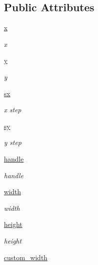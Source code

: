 \subsection*{Public Attributes}
\begin{DoxyCompactItemize}
\item 
\hyperlink{classvisualizer_1_1svgitem_1_1SvgItem_a2e9c288d8f56a32ef5e421f2a18da8d2}{x}
\begin{DoxyCompactList}\small\item\em x \end{DoxyCompactList}\item 
\hyperlink{classvisualizer_1_1svgitem_1_1SvgItem_aa578d8ef1d07a7489ba5e5ae3db9c999}{y}
\begin{DoxyCompactList}\small\item\em y \end{DoxyCompactList}\item 
\hyperlink{classvisualizer_1_1svgitem_1_1SvgItem_aeaf1e7bd3449c434fcd0a3ac90678bfa}{sx}
\begin{DoxyCompactList}\small\item\em x step \end{DoxyCompactList}\item 
\hyperlink{classvisualizer_1_1svgitem_1_1SvgItem_a89f6c42408a99a3cd6ea2611752d9b86}{sy}
\begin{DoxyCompactList}\small\item\em y step \end{DoxyCompactList}\item 
\hyperlink{classvisualizer_1_1svgitem_1_1SvgItem_a17ce7378d571b600e9bce497f176a2d9}{handle}
\begin{DoxyCompactList}\small\item\em handle \end{DoxyCompactList}\item 
\hyperlink{classvisualizer_1_1svgitem_1_1SvgItem_a6576a5ad9cd06ff7670b143135eb1b9d}{width}
\begin{DoxyCompactList}\small\item\em width \end{DoxyCompactList}\item 
\hyperlink{classvisualizer_1_1svgitem_1_1SvgItem_a87072079be0f8db0c514a93ff03c6989}{height}
\begin{DoxyCompactList}\small\item\em height \end{DoxyCompactList}\item 
\hyperlink{classvisualizer_1_1svgitem_1_1SvgItem_af260ac13861942bed817d7d02fef736b}{custom\+\_\+width}

\end{DoxyCompactItemize}
